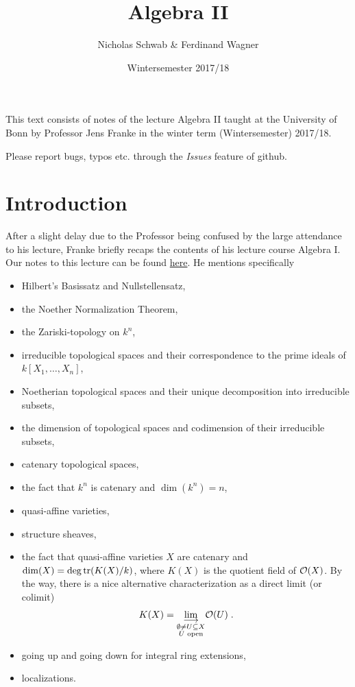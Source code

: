 \documentclass[a4paper,parskip=full,numbers=enddot]{scrreprt}
\title{Algebra II}
\author{Nicholas Schwab \& Ferdinand Wagner}
\date{Wintersemester 2017/18}
\begin{document}
\maketitle
{}
 
This text consists of notes of the lecture Algebra II taught at the University of Bonn by Professor Jens Franke in the winter term (Wintersemester) 2017/18. 

Please report bugs, typos etc. through the \emph{Issues} feature of github.

\tableofcontents

\chapter*{Introduction}
After a slight delay due to the Professor being confused by the large attendance to his lecture, Franke briefly recaps the contents of his lecture course Algebra I. Our notes to this lecture can be found \href{https://github.com/Nicholas42/AlgebraFranke/tree/master/AlgebraI}{here}\cite{alg1}. He mentions specifically
\begin{itemize}
 \item Hilbert's Basissatz and Nullstellensatz,
 \item the Noether Normalization Theorem,
 \item the Zariski-topology on $k^n$,
 \item irreducible topological spaces and their correspondence to the prime ideals of $k[X_1, \ldots, X_n]$,
 \item Noetherian topological spaces and their unique decomposition into irreducible subsets,
 \item the dimension of topological spaces and codimension of their irreducible subsets,
 \item catenary topological spaces,
 \item the fact that $k^n$ is catenary and $\dim(k^n) = n$,
 \item quasi-affine varieties,
 \item structure sheaves,
 \item the fact that quasi-affine varieties $X$ are catenary and $\dim(X) = \deg\operatorname{tr}(K(X)/k)$, where $K(X)$ is the quotient field of $\mathcal{O}(X)$. By the way, there is a nice alternative characterization as a direct limit (or colimit)
 \begin{align*}
 	K(X)=\colimit[\substack{\emptyset\not=U\subseteq X\\U\text{ open}}]\Oo(U)\;.
 \end{align*}
 \item going up and going down for integral ring extensions,
 \item localizations.
\end{itemize}
\end{document}

